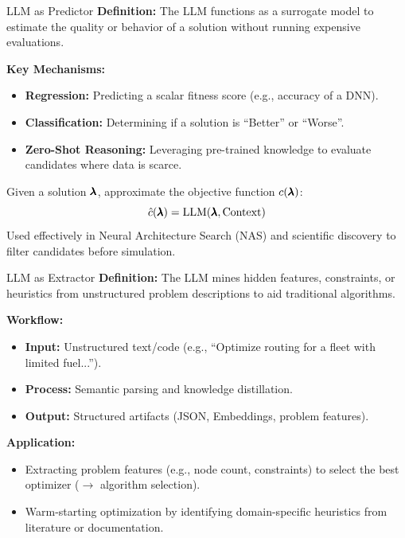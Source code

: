 \documentclass[main]{subfiles}
\begin{document}
\begin{frame}{LLM as Predictor}
    \textbf{Definition:} The LLM functions as a surrogate model to estimate the quality or behavior of a solution without running expensive evaluations.
    
    \vspace{0.5em}
    \textbf{Key Mechanisms:}
    \begin{itemize}
        \item \textbf{Regression:} Predicting a scalar fitness score (e.g., accuracy of a DNN).
        \item \textbf{Classification:} Determining if a solution is ``Better'' or ``Worse''.
        \item \textbf{Zero-Shot Reasoning:} Leveraging pre-trained knowledge to evaluate candidates where data is scarce.
    \end{itemize}

    \vspace{0.5em}
    Given a solution $\pmb{\lambda}$, approximate the objective function $c(\pmb{\lambda})$:
    $$ \hat{c}(\pmb{\lambda}) = \text{LLM}(\pmb{\lambda}, \text{Context}) $$
    Used effectively in Neural Architecture Search (NAS) and scientific discovery to filter candidates before simulation.
\end{frame}

\begin{frame}{LLM as Extractor}
    \textbf{Definition:} The LLM mines hidden features, constraints, or heuristics from unstructured problem descriptions to aid traditional algorithms.
    
    \vspace{0.5em}
    \textbf{Workflow:}
    \begin{itemize}
        \item \textbf{Input:} Unstructured text/code (e.g., ``Optimize routing for a fleet with limited fuel...'').
        \item \textbf{Process:} Semantic parsing and knowledge distillation.
        \item \textbf{Output:} Structured artifacts (JSON, Embeddings, problem features).
    \end{itemize}
    
    \vspace{0.5em}
    \textbf{Application:}
    \begin{itemize}
        \item Extracting problem features (e.g., node count, constraints) to select the best optimizer ($\to$ algorithm selection).
        \item Warm-starting optimization by identifying domain-specific heuristics from literature or documentation.
    \end{itemize}
\end{frame}
\end{document}
